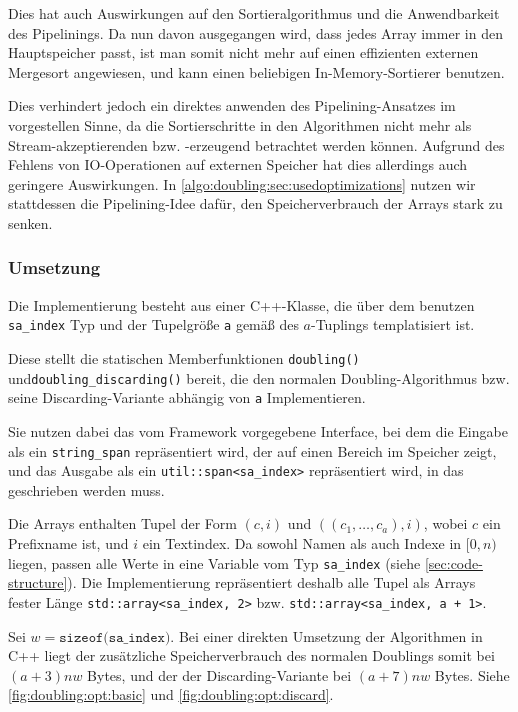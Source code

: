 Dies hat auch Auswirkungen auf den Sortieralgorithmus und die Anwendbarkeit des Pipelinings. Da nun davon ausgegangen wird, dass jedes Array immer in den Hauptspeicher passt, ist man somit nicht mehr auf einen effizienten externen Mergesort angewiesen, und kann einen beliebigen In-Memory-Sortierer benutzen. 

Dies verhindert jedoch ein direktes anwenden des Pipelining-Ansatzes im vorgestellen Sinne, da die Sortierschritte in den Algorithmen nicht mehr als Stream-akzeptierenden bzw. -erzeugend betrachtet werden können. Aufgrund des Fehlens von IO-Operationen auf externen Speicher hat dies allerdings auch geringere Auswirkungen. In \cref{algo:doubling:sec:usedoptimizations} nutzen wir stattdessen die Pipelining-Idee dafür, den Speicherverbrauch der Arrays stark zu senken.

\subsubsection{Umsetzung}

Die Implementierung besteht aus einer C++-Klasse, die über dem benutzen \texttt{sa\_index} Typ und der Tupelgröße \texttt{a} gemäß des $a$-Tuplings templatisiert ist.

Diese stellt die statischen Memberfunktionen \texttt{doubling()} und\linebreak \texttt{doubling\_discarding()} bereit, die den normalen Doubling-Algorithmus bzw. seine Discarding-Variante abhängig von \texttt{a} Implementieren.

Sie nutzen dabei das vom Framework vorgegebene Interface, bei dem die Eingabe als ein \texttt{string\_span} repräsentiert wird, der auf einen Bereich im Speicher zeigt, und das Ausgabe \sa als ein \texttt{util::span<sa\_index>} repräsentiert wird, in das geschrieben werden muss.

Die Arrays enthalten Tupel der Form  $(c, i)$ und $((c_1, \dots, c_a), i)$, wobei $c$ ein Prefixname ist, und $i$ ein Textindex. Da sowohl Namen als auch Indexe in $[0, n)$ liegen, passen alle Werte in eine Variable vom Typ \texttt{sa\_index} (siehe \cref{sec:code-structure}). Die Implementierung repräsentiert deshalb alle Tupel als Arrays fester Länge \texttt{std::array<sa\_index, 2>} bzw. \texttt{std::array<sa\_index, a + 1>}.

Sei $w = \texttt{sizeof(sa\_index)}$. Bei einer direkten Umsetzung der Algorithmen in C++ liegt der zusätzliche Speicherverbrauch des normalen Doublings somit bei $(a + 3)nw$ Bytes, und der der Discarding-Variante bei $(a + 7)nw$ Bytes. Siehe \cref{fig:doubling:opt:basic} und \cref{fig:doubling:opt:discard}.

